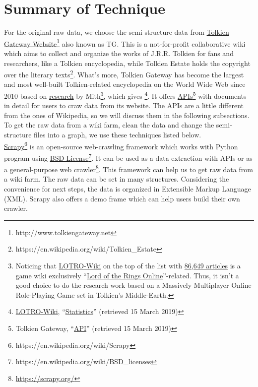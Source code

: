 \section{Summary of Technique}
\vspace{-5pt}
\label{Ch-2:Sec:Summary of Technique}
For the original raw data, we choose the semi-structure data from \href{http://www.tolkiengateway.net}{Tolkien Gateway Website}\footnote{http://www.tolkiengateway.net} also known as TG. This is a not-for-profit collaborative wiki which aims to collect and organize the works of J.R.R. Tolkien for fans and researchers, like a Tolkien encyclopedia, while Tolkien Estate holds the copyright over the literary texts\footnote{https://en.wikipedia.org/wiki/Tolkien\_Estate}. What's more, Tolkien Gateway has become the largest and most well-built Tolkien-related encyclopedia on the World Wide Web since 2010 based on \href{http://tolkiengateway.net/wiki/List\_of\_Tolkien\_Encyclopedias}{research} by Mith\footnote{Noticing that \href{https://lotro-wiki.com/}{LOTRO-Wiki} on the top of the list with \href{https://lotro-wiki.com/index.php/Special:Statistics}{86,649 articles} is a game wiki exclusively ``\href{https://lotro-wiki.com/index.php/Lord_of_the_Rings_Online}{Lord of the Rings Online}''-related. Thus, it isn't a good choice to do the research work based on a Massively Multiplayer Online Role-Playing Game set in Tolkien's Middle-Earth.}, which gives \footnote{\href{https://lotro-wiki.com/index.php/Lord\_of\_the\_Rings\_Online}{LOTRO-Wiki}, ``\href{https://lotro-wiki.com/index.php/Special:Statistics}{Statistics}'' (retrieved 15 March 2019)}. It offers \href{http://tolkiengateway.net/w/api.php}{APIs}\footnote{Tolkien Gateway, ``\href{http://tolkiengateway.net/w/api.php}{API}'' (retrieved 15 March 2019)} with documents in detail for users to craw data from its website. The APIs are a little different from the ones of Wikipedia, so we will discuss them in the following subsections.\\
To get the raw data from a wiki farm, clean the data and change the semi-structure files into a graph, we use these techniques listed below.\\
\indent\href{https://scrapy.org/}{Scrapy}\footnote{https://en.wikipedia.org/wiki/Scrapy} is an open-source web-crawling framework which works with Python program using \href{http://www.linfo.org/bsdlicense.html}{BSD License}\footnote{https://en.wikipedia.org/wiki/BSD\_licenses}. It can be used as a data extraction with APIs or as a general-purpose web crawler\footnote{\href{https://scrapy.org/}{https://scrapy.org/}}. This framework can help us to get raw data from a wiki farm. The raw data can be set in many structures. Considering the convenience for next steps, the data is organized in Extensible Markup Language (XML). Scrapy also offers a demo frame which can help users build their own crawler.
